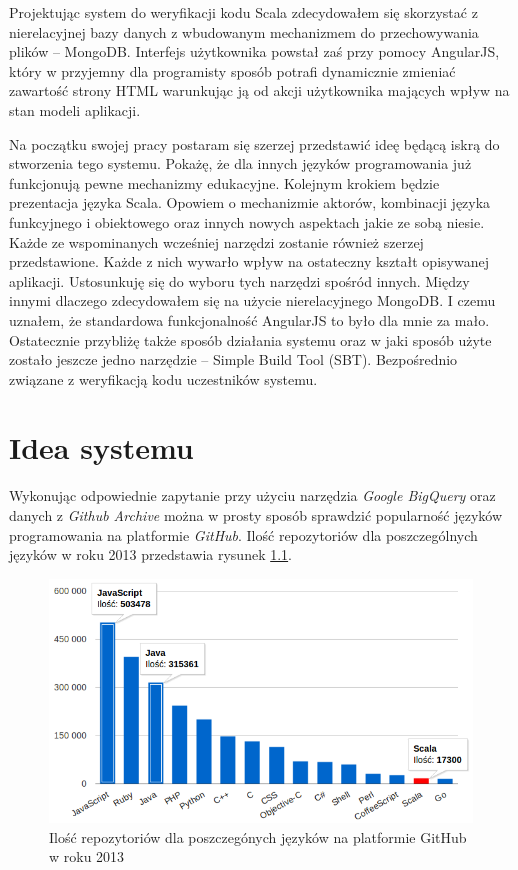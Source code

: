 \documentclass[brudnopis]{xmgr}
\begin{document}
Projektując system do weryfikacji kodu Scala zdecydowałem się skorzystać z nierelacyjnej bazy danych z wbudowanym mechanizmem do przechowywania plików -- MongoDB. Interfejs użytkownika powstał zaś przy pomocy AngularJS, który w przyjemny dla programisty sposób  potrafi dynamicznie zmieniać zawartość strony HTML warunkując ją od akcji użytkownika mających wpływ na stan modeli aplikacji.

\medskip Na początku swojej pracy postaram się szerzej przedstawić ideę będącą iskrą do stworzenia tego systemu. Pokażę, że dla innych języków programowania już funkcjonują pewne mechanizmy edukacyjne. Kolejnym krokiem będzie prezentacja języka Scala. Opowiem o mechanizmie aktorów, kombinacji języka funkcyjnego i obiektowego oraz innych nowych aspektach jakie ze sobą niesie. Każde ze wspominanych wcześniej narzędzi zostanie również szerzej przedstawione. Każde z nich wywarło wpływ na ostateczny kształt opisywanej aplikacji. Ustosunkuję się do wyboru tych narzędzi spośród innych. Między innymi dlaczego zdecydowałem się na użycie nierelacyjnego MongoDB. I czemu uznałem, że standardowa funkcjonalność AngularJS to było dla mnie za mało. Ostatecznie przybliżę także sposób działania systemu oraz w jaki sposób użyte zostało jeszcze jedno narzędzie -- Simple Build Tool (SBT). Bezpośrednio związane z weryfikacją kodu uczestników systemu. 

\chapter{Idea systemu}

Wykonując odpowiednie zapytanie przy użyciu narzędzia \textit{Google BigQuery} oraz danych z \textit{Github Archive} można w prosty sposób sprawdzić popularność języków programowania na platformie \textit{GitHub}. Ilość repozytoriów dla poszczególnych języków w roku 2013  przedstawia rysunek \ref{RYS.1}. 

\begin{figure}[!tbh]
\centering 
\includegraphics[width=.95\hsize]{fig/top_github_languages_2013}
\caption{Ilość repozytoriów dla poszczegónych języków na platformie GitHub w roku 2013 \label{RYS.1}}
\end{figure}
\end{document}
